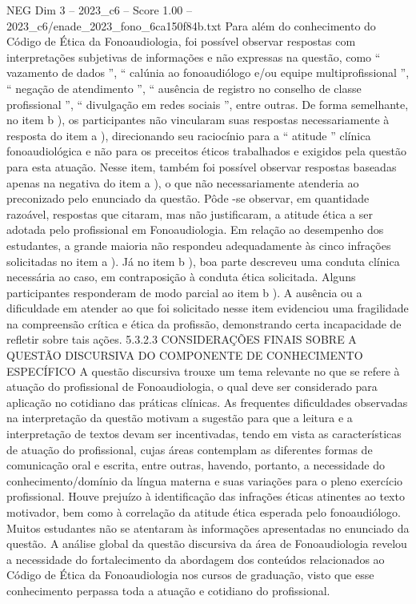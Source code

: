 \begin{textsample}{NEG Dim 3 – 2023\_c6 – Score 1.00 – 2023\_c6/enade\_2023\_fono\_6ca150f84b.txt}
Para além do conhecimento do Código de Ética da Fonoaudiologia, foi possível observar respostas com interpretações subjetivas de informações e não expressas na questão, como “ vazamento de dados ”, “ calúnia ao fonoaudiólogo e/ou equipe multiprofissional ”, “ negação de atendimento ”, “ ausência de registro no conselho de classe profissional ”, “ divulgação em redes sociais ”, entre outras.
De forma semelhante, no item b ), os participantes não vincularam suas respostas necessariamente à resposta do item a ), direcionando seu raciocínio para a “ atitude ” clínica fonoaudiológica e não para os preceitos éticos trabalhados e exigidos pela questão para esta atuação.
Nesse item, também foi possível observar respostas baseadas apenas na negativa do item a ), o que não necessariamente atenderia ao preconizado pelo enunciado da questão.
Pôde -se observar, em quantidade razoável, respostas que citaram, mas não justificaram, a atitude ética a ser adotada pelo profissional em Fonoaudiologia.
Em relação ao desempenho dos estudantes, a grande maioria não respondeu adequadamente às cinco infrações solicitadas no item a ).
Já no item b ), boa parte descreveu uma conduta clínica necessária ao caso, em contraposição à conduta ética solicitada.
Alguns participantes responderam de modo parcial ao item b ).
A ausência ou a dificuldade em atender ao que foi solicitado nesse item evidenciou uma fragilidade na compreensão crítica e ética da profissão, demonstrando certa incapacidade de refletir sobre tais ações. 5.3.2.3 CONSIDERAÇÕES FINAIS SOBRE A QUESTÃO DISCURSIVA DO COMPONENTE DE CONHECIMENTO ESPECÍFICO A questão discursiva trouxe um tema relevante no que se refere à atuação do profissional de Fonoaudiologia, o qual deve ser considerado para aplicação no cotidiano das práticas clínicas.
As frequentes dificuldades observadas na interpretação da questão motivam a sugestão para que a leitura e a interpretação de textos devam ser incentivadas, tendo em vista as características de atuação do profissional, cujas áreas contemplam as diferentes formas de comunicação oral e escrita, entre outras, havendo, portanto, a necessidade do conhecimento/domínio da língua materna e suas variações para o pleno exercício profissional.
Houve prejuízo à identificação das infrações éticas atinentes ao texto motivador, bem como à correlação da atitude ética esperada pelo fonoaudiólogo.
Muitos estudantes não se atentaram às informações apresentadas no enunciado da questão.
A análise global da questão discursiva da área de Fonoaudiologia revelou a necessidade do fortalecimento da abordagem dos conteúdos relacionados ao Código de Ética da Fonoaudiologia nos cursos de graduação, visto que esse conhecimento perpassa toda a atuação e cotidiano do profissional.

\end{textsample}
